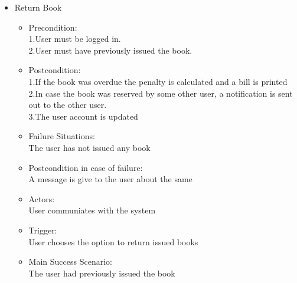 \documentclass{article}
\begin{document}
\begin{enumerate}
\begin{itemize}
 \item Return Book\\
 \begin{itemize}
 \item Precondition:\\
 1.User must be logged in.\\
 2.User must have previously issued the book.\\
 \item Postcondition:\\
 1.If the book was overdue the penalty is calculated and a bill is printed\\ 
 2.In case the book was reserved by some other user, a notification is sent out to the other user.\\
 3.The user account is updated\\
 \item Failure Situations:\\The user has not issued any book\\
 \item Postcondition in case of failure:\\A message is give to the user about the same\\
 \item Actors:\\ User communiates with the system\\
 \item Trigger:\\ User chooses the option to return issued books\\
\item  Main Success Scenario: \\The user had previously issued the book\\
 \end{itemize}
 

\end{itemize}
\end{enumerate}
\end{document}

